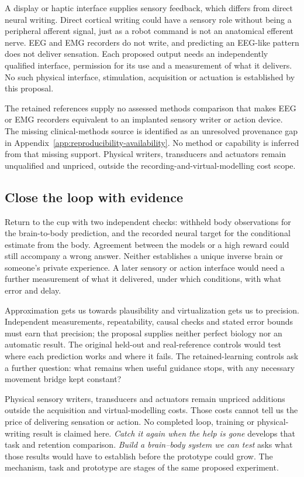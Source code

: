 A display or haptic interface supplies sensory feedback, which differs from direct neural writing. Direct cortical writing could have a sensory role without being a peripheral afferent signal, just as a robot command is not an anatomical efferent nerve. EEG and EMG recorders do not write, and predicting an EEG-like pattern does not deliver sensation. Each proposed output needs an independently qualified interface, permission for its use and a measurement of what it delivers. No such physical interface, stimulation, acquisition or actuation is established by this proposal.

The retained references supply no assessed methods comparison that makes EEG or EMG recorders equivalent to an implanted sensory writer or action device. The missing clinical-methods source is identified as an unresolved provenance gap in Appendix~\ref{app:reproducibility-availability}. No method or capability is inferred from that missing support. Physical writers, transducers and actuators remain unqualified and unpriced, outside the recording-and-virtual-modelling cost scope.

\subsection{Close the loop with evidence}
Return to the cup with two independent checks: withheld body observations
for the brain-to-body prediction, and the recorded neural target for the
conditional estimate from the body. Agreement between the models or a high
reward could still accompany a wrong answer. Neither establishes a unique
inverse brain or someone's private experience. A later sensory or action
interface would need a further measurement of what it delivered, under which
conditions, with what error and delay.

Approximation gets us towards plausibility and virtualization gets us to
precision. Independent measurements, repeatability, causal checks and stated
error bounds must earn that precision; the proposal supplies neither perfect
biology nor an automatic result. The original held-out and real-reference
controls would test where each prediction works and where it fails. The
retained-learning controls ask a further question: what remains when useful
guidance stops, with any necessary movement bridge kept constant?

Physical sensory writers, transducers and actuators remain unpriced additions
outside the acquisition and virtual-modelling costs. Those costs cannot tell us
the price of delivering sensation or action. No completed loop, training or
physical-writing result is claimed here. \emph{Catch it again when the help is
gone} develops that task and retention comparison. \emph{Build a brain--body
system we can test} asks what those results would have to establish before the
prototype could grow. The mechanism, task and prototype are stages of the same
proposed experiment.

